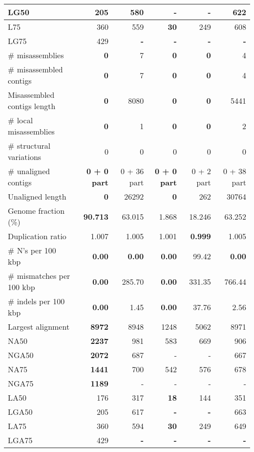 \documentclass[12pt,a4paper]{article}
\begin{document}
\begin{table}[ht]
\begin{center}
\begin{tabular}{|l*{5}{|r}|}
LG50 & 205 & 580 & {\bf -} & {\bf -} & 622 \\ \hline
L75 & 360 & 559 & {\bf 30} & 249 & 608 \\ \hline
LG75 & 429 & {\bf -} & {\bf -} & {\bf -} & {\bf -} \\ \hline
\# misassemblies & {\bf 0} & 7 & {\bf 0} & {\bf 0} & 4 \\ \hline
\# misassembled contigs & {\bf 0} & 7 & {\bf 0} & {\bf 0} & 4 \\ \hline
Misassembled contigs length & {\bf 0} & 8080 & {\bf 0} & {\bf 0} & 5441 \\ \hline
\# local misassemblies & {\bf 0} & 1 & {\bf 0} & {\bf 0} & 2 \\ \hline
\# structural variations & 0 & 0 & 0 & 0 & 0 \\ \hline
\# unaligned contigs & {\bf 0 + 0 part} & 0 + 36 part & {\bf 0 + 0 part} & 0 + 2 part & 0 + 38 part \\ \hline
Unaligned length & {\bf 0} & 26292 & {\bf 0} & 262 & 30764 \\ \hline
Genome fraction (\%) & {\bf 90.713} & 63.015 & 1.868 & 18.246 & 63.252 \\ \hline
Duplication ratio & 1.007 & 1.005 & 1.001 & {\bf 0.999} & 1.005 \\ \hline
\# N's per 100 kbp & {\bf 0.00} & {\bf 0.00} & {\bf 0.00} & 99.42 & {\bf 0.00} \\ \hline
\# mismatches per 100 kbp & {\bf 0.00} & 285.70 & {\bf 0.00} & 331.35 & 766.44 \\ \hline
\# indels per 100 kbp & {\bf 0.00} & 1.45 & {\bf 0.00} & 37.76 & 2.56 \\ \hline
Largest alignment & {\bf 8972} & 8948 & 1248 & 5062 & 8971 \\ \hline
NA50 & {\bf 2237} & 981 & 583 & 669 & 906 \\ \hline
NGA50 & {\bf 2072} & 687 & - & - & 667 \\ \hline
NA75 & {\bf 1441} & 700 & 542 & 576 & 678 \\ \hline
NGA75 & {\bf 1189} & - & - & - & - \\ \hline
LA50 & 176 & 317 & {\bf 18} & 144 & 351 \\ \hline
LGA50 & 205 & 617 & {\bf -} & {\bf -} & 663 \\ \hline
LA75 & 360 & 594 & {\bf 30} & 249 & 649 \\ \hline
LGA75 & 429 & {\bf -} & {\bf -} & {\bf -} & {\bf -} \\ \hline
\end{tabular}
\end{center}
\end{table}
\end{document}
